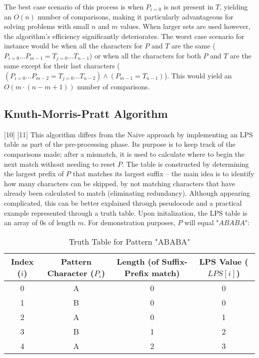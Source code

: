 \documentclass[12pt]{article}
\begin{document}
The best case scenario of this process is when $P_{i=0}$ is not present in $T$, yielding an
$O(n)$ number of comparisons, making it particularly advantageous for solving problems
with small $n$ and $m$ values. When larger sets are used however, the algorithm's efficiency significantly deteriorates. The worst case scenario for instance would be when
all the characters for $P$ and $T$ are the same (${P_{i=0} \ldots P_{m-1}} = {T_{j=0} \ldots T_{n-1}}$) or
when all the characters for both $P$ and $T$ are the same except for their last characters ($({P_{i=0} \ldots P_{m-2}} = {T_{j=0} \ldots T_{n-2}}) \land (P_{m-1} = T_{n-1})$). This would yield an
$O(m \cdot (n - m + 1))$ number of comparisons.

\subsection{Knuth-Morris-Pratt Algorithm}

[10] [11] This algorithm differs from the Naive approach by implementing an LPS table
as part of the pre-processing phase. Its purpose is to keep track of the comparisons made;
after a mismatch, it is used to calculate where to begin the next match without needing
to reset $P$. The table is constructed by determining the largest prefix of $P$ that matches
its largest suffix -- the main idea is to identify how many characters can be skipped, by not
matching characters that have already been calculated to match (eliminating redundancy).
Although appearing complicated, this can be better explained through pseudocode and a
practical example represented through a truth table. Upon initalization, the LPS table is
an array of 0s of length $m$. For demonstration purposes, $P$ will equal "$ABABA$":

\begin{table}[!htbp]
    \centering
    \begin{tabular}{|c|c|c|c|}
        \hline
        Index ($i$) & Pattern Character ($P_{i}$) & Length (of Suffix-Prefix match) & LPS Value ($LPS[i]$) \\
        \hline
        0 & A & 0 & 0 \\
        1 & B & 0 & 0 \\
        2 & A & 0 & 1 \\
        3 & B & 1 & 2 \\
        4 & A & 2 & 3 \\
        \hline
    \end{tabular}
    \caption{Truth Table for Pattern "ABABA"}
\end{table}
\end{document}
